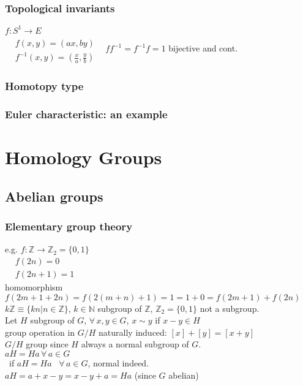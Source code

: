 \documentclass[twoside]{amsart}
\newcommand{\exercisehead}[1]
  {\smallskip
   \noindent{\large\bf Exercise #1.}
   }
\begin{document}
\subsubsection{Topological invariants}

\exercisehead{2.18} $f:S^1 \to E$ \\
$\begin{aligned} & \quad \\ 
  & f(x,y) = (ax,by) \\ 
  & f^{-1}(x,y) = \left( \frac{x}{a}, \frac{y}{b} \right) \end{aligned}$ \quad \, $ff^{-1} = f^{-1}f = 1$ bijective and cont. 

\subsubsection{Homotopy type}

\subsubsection{Euler characteristic: an example}


\section{Homology Groups} 

\subsection{Abelian groups}

\subsubsection{Elementary group theory}

e.g. $f: \mathbb{Z} \to \mathbb{Z}_2 = \lbrace 0 , 1 \rbrace$ \\
$\begin{aligned}
  & f(2n) = 0 \\ 
  & f(2n+1) = 1 \end{aligned}$  \\
homomorphism $f(2m+1 +2n) = f(2(m+n) + 1) = 1 = 1 + 0 = f(2m+1) + f(2n)$ \\
$k\mathbb{Z} \equiv \lbrace kn | n \in \mathbb{Z} \rbrace$, $k \in \mathbb{N}$ subgroup of $\mathbb{Z}$, $\mathbb{Z}_2 = \lbrace 0 ,1 \rbrace$ not a subgroup.  \\

Let $H$ subgroup of $G$, $\forall \, x, y \in G$, $x\sim y$ if $x- y \in H$ \\
group operation in $G/H$ naturally induced: $[x] + [y] = [x+y]$ \\
$G/H$ group since $H$ always a normal subgroup of $G$.  \\
\quad $aH = Ha \, \forall \, a \in G$ \\
\quad \, if $aH = Ha$ \, $\forall \, a \in G$, normal indeed.  \\
\quad $aH = a + x - y = x - y + a = Ha$ (since $G$ abelian) \\
\end{document}
